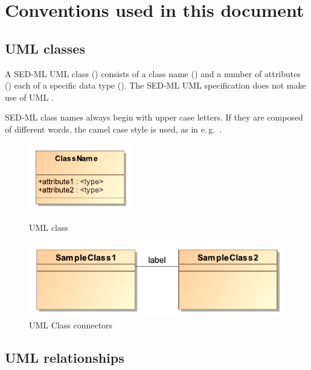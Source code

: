 \section{Conventions used in this document}
\label{sec:conventions}

\subsection{UML classes}
A SED-ML UML class () consists of a class name () and a number of attributes () each of a specific data type (). The SED-ML UML specification does not make use of UML .

SED-ML class names always begin with upper case letters. If they are composed of different words, the camel case style is used, as in e.\,g.\ .

\begin{figure}[ht]
\centering
\begin{minipage}{.5\textwidth}
	\centering
	\includegraphics[width=0.4\textwidth]{images/pdf/umlClass}
	\caption{UML class}
	\label{fig:umlClass}    
\end{minipage}%
\begin{minipage}{.5\textwidth}
	\centering
	\includegraphics[width=1.0\textwidth]{images/pdf/classRelation}
	\caption{UML Class connectors}
	\label{fig:umlConnectors}
\end{minipage}
\end{figure}

\subsection{UML relationships}
